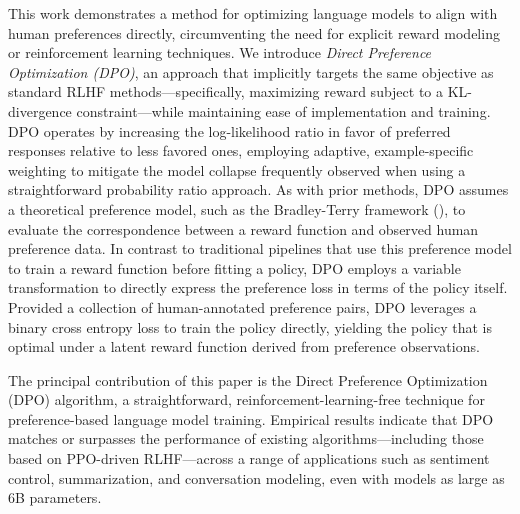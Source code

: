 This work demonstrates a method for optimizing language models to align with human preferences directly, circumventing the need for explicit reward modeling or reinforcement learning techniques. We introduce \textit{{Direct Preference Optimization} (DPO)}, an approach that implicitly targets the same objective as standard RLHF methods—specifically, maximizing reward subject to a KL-divergence constraint—while maintaining ease of implementation and training. DPO operates by increasing the log-likelihood ratio in favor of preferred responses relative to less favored ones, employing adaptive, example-specific weighting to mitigate the model collapse frequently observed when using a straightforward probability ratio approach. As with prior methods, DPO assumes a theoretical preference model, such as the Bradley-Terry framework (\cite{bradley1952rankanalysis}), to evaluate the correspondence between a reward function and observed human preference data. In contrast to traditional pipelines that use this preference model to train a reward function before fitting a policy, DPO employs a variable transformation to directly express the preference loss in terms of the policy itself. Provided a collection of human-annotated preference pairs, DPO leverages a binary cross entropy loss to train the policy directly, yielding the policy that is optimal under a latent reward function derived from preference observations.

The principal contribution of this paper is the Direct Preference Optimization (DPO) algorithm, a straightforward, reinforcement-learning-free technique for preference-based language model training. Empirical results indicate that DPO matches or surpasses the performance of existing algorithms—including those based on PPO-driven RLHF—across a range of applications such as sentiment control, summarization, and conversation modeling, even with models as large as 6B parameters.

